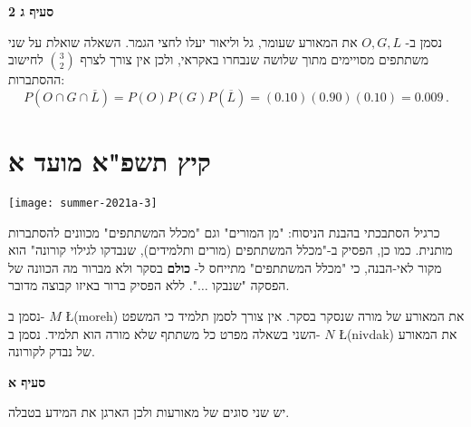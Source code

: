\textbf{סעיף ג 2}

נסמן ב-%
$O,G,L$
את המאורע שעומר, גל וליאור יעלו לחצי הגמר. השאלה שואלת על שני משתתפים מסויימים מתוך שלושה שנבחרו באקראי, ולכן אין צורך לצרף
${3\choose 2}$
לחישוב ההסתברות:
\[
P(O\cap G \cap \overline{L}) = P(O)P(G)P(\overline{L}) =
\left(0.10\right)\left(0.90\right)\left(0.10\right)=0.009\,.
\]


\newpage

\section{קיץ תשפ"א מועד א}

\begin{center}
\texttt{[image: summer-2021a-3]}
\end{center}

כרגיל הסתבכתי בהבנת הניסוח: "מן המורים" וגם "מכלל המשתתפים" מכוונים להסתברות מותנית. כמו כן, הפסיק ב-"מכלל המשתתפים (מורים ותלמידים), שנבדקו לגילוי קורונה" הוא מקור לאי-הבנה, כי "מכלל המשתתפים" מתייחס ל-%
\textbf{כולם}
בסקר ולא מברור מה הכוונה של הפסקה "שנבקו 
$\ldots$".
ללא הפסיק ברור באיזו קבוצה מדובר.

נסמן ב-%
$M$ \L{(moreh)}
את המאורע של מורה שנסקר בסקר. אין צורך לסמן תלמיד כי המשפט השני בשאלה מפרט כל משתתף שלא מורה הוא תלמיד. נסמן ב-%
$N$ \L{(nivdak)}
את המאורע של נבדק לקורונה.

\textbf{סעיף א}

יש שני סוגים של מאורעות ולכן הארגן את המידע בטבלה. 

